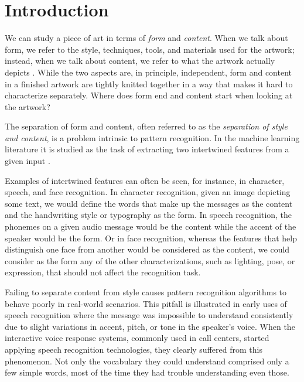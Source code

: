
\chapter{Introduction}
\label{chap:intro}




We can study a piece of art in terms of \emph{form} and \emph{content}.
When we talk about form, we refer to the style, techniques, tools, and materials used for the artwork; instead, when we talk about content, we refer to what the artwork actually depicts \cite{Esaak}.
While the two aspects are, in principle, independent, form and content in a finished artwork are tightly knitted together in a way that makes it hard to characterize separately.
Where does form end and content start when looking at the artwork? \cite{Xie2007}

The separation of form and content, often referred to as the \emph{separation of style and content}, is a problem intrinsic to pattern recognition.
In the machine learning literature it is studied as the task of extracting two intertwined features from a given input \cite{Tenenbaum2000}.

Examples of intertwined features can often be seen, for instance, in character, speech, and face recognition.
In character recognition, given an image depicting some text, we would define the words that make up the messages as the content and the handwriting style or typography as the form.
In speech recognition, the phonemes on a given audio message would be the content while the accent of the speaker would be the form.
Or in face recognition, whereas the features that help distinguish one face from another would be considered as the content, we could consider as the form any of the other characterizations, such as lighting, pose, or expression, that should not affect the recognition task.

Failing to separate content from style causes pattern recognition algorithms to behave poorly in real-world scenarios.
This pitfall is illustrated in early uses of speech recognition where the message was impossible to understand consistently due to slight variations in accent, pitch, or tone in the speaker's voice.
When the interactive voice response systems, commonly used in call centers, started applying speech recognition technologies, they clearly suffered from this phenomenon.
Not only the vocabulary they could understand comprised only a few simple words, most of the time they had trouble understanding even those.


